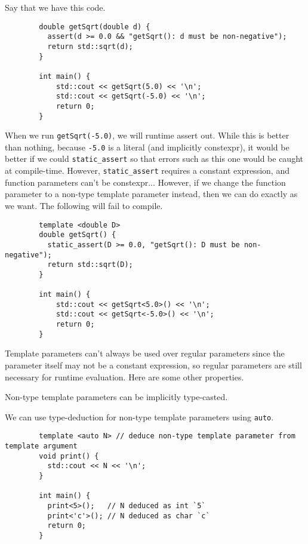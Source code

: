 \documentclass{article}
\begin{document}
    \begin{example}[Motivation]
      Say that we have this code. 

      \begin{lstlisting}
        double getSqrt(double d) {
          assert(d >= 0.0 && "getSqrt(): d must be non-negative");
          return std::sqrt(d);
        }

        int main() {
            std::cout << getSqrt(5.0) << '\n';
            std::cout << getSqrt(-5.0) << '\n';
            return 0;
        } 
      \end{lstlisting}

      When we run \texttt{getSqrt(-5.0)}, we will runtime assert out. While this is better than nothing, because \texttt{-5.0} is a literal (and implicitly constexpr), it would be better if we could \texttt{static\_assert} so that errors such as this one would be caught at compile-time. However, \texttt{static\_assert} requires a constant expression, and function parameters can’t be constexpr... However, if we change the function parameter to a non-type template parameter instead, then we can do exactly as we want. The following will fail to compile. 
      \begin{lstlisting}
        template <double D> 
        double getSqrt() {
          static_assert(D >= 0.0, "getSqrt(): D must be non-negative");
          return std::sqrt(D);
        }

        int main() {
            std::cout << getSqrt<5.0>() << '\n';
            std::cout << getSqrt<-5.0>() << '\n';
            return 0;
        } 
      \end{lstlisting}
    \end{example}

    Template parameters can't always be used over regular parameters since the parameter itself may not be a constant expression, so regular parameters are still necessary for runtime evaluation. Here are some other properties. 

    \begin{lemma} 
      Non-type template parameters can be implicitly type-casted. 
    \end{lemma}

    \begin{lemma} 
      We can use type-deduction for non-type template parameters using \texttt{auto}. 
      \begin{lstlisting}
        template <auto N> // deduce non-type template parameter from template argument
        void print() {
          std::cout << N << '\n';
        }

        int main() {
          print<5>();   // N deduced as int `5`
          print<'c'>(); // N deduced as char `c`
          return 0;
        } 
      \end{lstlisting}
    \end{lemma} 
\end{document}
